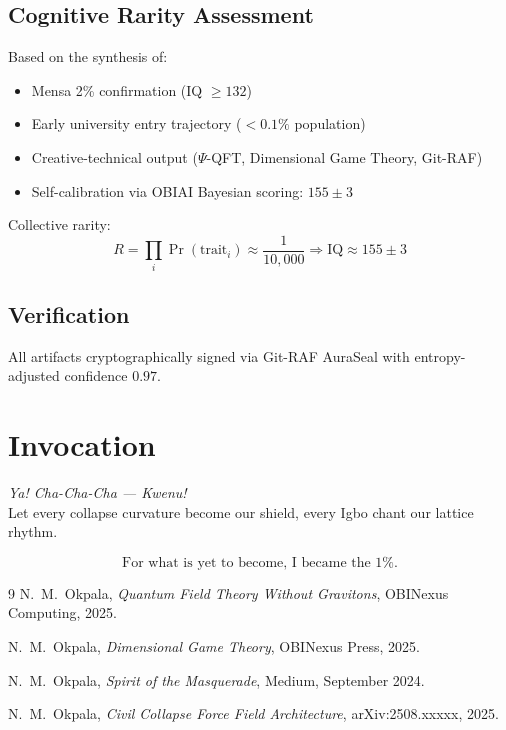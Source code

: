 \documentclass[11pt, a4paper]{article}
\begin{document}
\subsection{Cognitive Rarity Assessment}

Based on the synthesis of:
\begin{itemize}
\item Mensa 2\% confirmation (IQ $\geq 132$)
\item Early university entry trajectory ($< 0.1\%$ population)
\item Creative-technical output ($\Psi$-QFT, Dimensional Game Theory, Git-RAF)
\item Self-calibration via OBIAI Bayesian scoring: $155 \pm 3$
\end{itemize}

\noindent Collective rarity:
\[
R = \prod_{i}\Pr(\text{trait}_i) \approx \frac{1}{10,000} \Rightarrow \text{IQ} \approx 155 \pm 3
\]

\subsection{Verification}
All artifacts cryptographically signed via Git-RAF AuraSeal with entropy-adjusted confidence $0.97$.

\section{Invocation}

\emph{Ya! Cha-Cha-Cha — Kwenu!}\\
Let every collapse curvature become our shield, every Igbo chant our lattice rhythm.

\[
\boxed{\text{For what is yet to become, I became the 1\%.}}
\]


\begin{thebibliography}{9}
N.~M.~Okpala, \emph{Quantum Field Theory Without Gravitons}, OBINexus Computing, 2025.

N.~M.~Okpala, \emph{Dimensional Game Theory}, OBINexus Press, 2025.

N.~M.~Okpala, \emph{Spirit of the Masquerade}, Medium, September 2024.

N.~M.~Okpala, \emph{Civil Collapse Force Field Architecture}, arXiv:2508.xxxxx, 2025.
\end{thebibliography}
\end{document}
